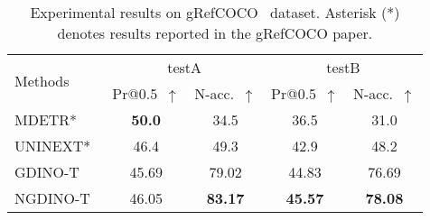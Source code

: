 \begin{table}[t]
  \begin{center}
  \caption{Experimental results on gRefCOCO~\cite{grefcoco} dataset. Asterisk (*) denotes results reported in the gRefCOCO paper.}\label{tab:results_grec}
  \centering
   \resizebox{1\linewidth}{!}
     {\begin{tabular}{lcc|cc}
     \toprule
      \multirow{2}{*}{Methods} & \multicolumn{2}{c|}{testA} & \multicolumn{2}{c}{testB} \\
       &    Pr@0.5~$\uparrow$ &  N-acc.~$\uparrow$   &Pr@0.5~$\uparrow$    & N-acc.~$\uparrow$  \\
    \midrule

        MDETR*~\cite{mdetr} & \textbf{50.0} & 34.5 & 36.5 & 31.0   \\
        UNINEXT*~\cite{yan2023universal}  & 46.4 & 49.3 & 42.9 & 48.2 \\
        GDINO-T~\cite{gdino}  &  45.69 & 79.02  & 44.83  & 76.69 \\
        NGDINO-T & 46.05  & \textbf{83.17}  & \textbf{45.57} & \textbf{78.08} \\
        \bottomrule
\end{tabular}}
\end{center}
\end{table}